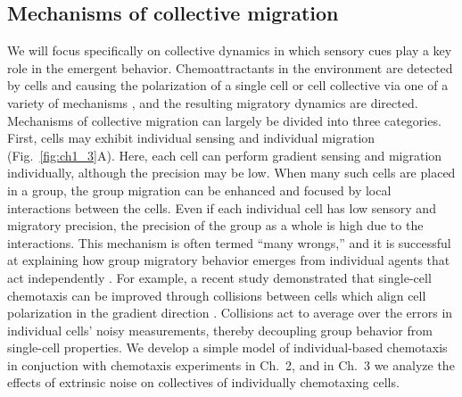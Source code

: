 \subsection{Mechanisms of collective migration}

We will focus specifically on collective dynamics in which sensory cues play a key role in the emergent behavior. Chemoattractants in the environment are detected by cells and causing the polarization of a single cell or cell collective via one of a variety of mechanisms \cite{jilkine2011comparison}, and the resulting migratory dynamics are directed.
Mechanisms of collective migration can largely be divided into three categories. First, cells may exhibit individual sensing and individual migration (Fig.\ \ref{fig:ch1_3}A). Here, each cell can perform gradient sensing and migration individually, although the precision may be low. When many such cells are placed in a group, the group migration can be enhanced and focused by local interactions between the cells. Even if each individual cell has low sensory and migratory precision, the precision of the group as a whole is high due to the interactions. This mechanism is often termed ``many wrongs,'' and it is successful at explaining how group migratory behavior emerges from individual agents that act independently \cite{coburn2013tactile,simons2004many}.
For example, a recent study demonstrated that single-cell chemotaxis can be improved through collisions between cells which align cell polarization in the gradient direction \cite{coburn2013tactile}. Collisions act to average over the errors in individual cells' noisy measurements, thereby decoupling group behavior from single-cell properties. We develop a simple model of individual-based chemotaxis in conjuction with chemotaxis experiments in Ch.\ 2, and in Ch.\ 3 we analyze the effects of extrinsic noise on collectives of individually chemotaxing cells.


